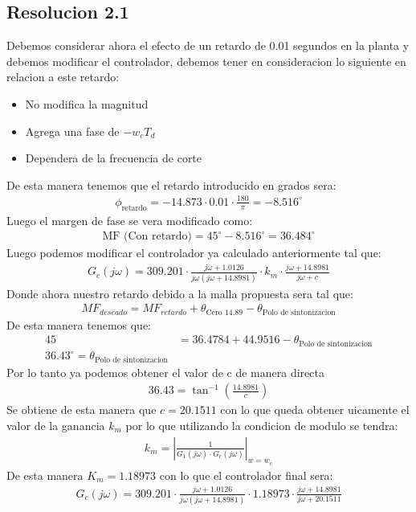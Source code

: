 \documentclass[
  11pt,
  letterpaper,
   addpoints,
   answers
  ]{exam}
\begin{document}
\begin{questions}
\begin{solution}
\subsection*{Resolucion 2.1}
Debemos considerar ahora el efecto de un retardo de 0.01 segundos en la planta y debemos modificar el controlador, debemos tener en consideracion lo siguiente en relacion a este retardo:
\begin{itemize}
    \item No modifica la magnitud
    \item Agrega una fase de $-w_{c}T_{d}$
    \item Dependera de la frecuencia de corte
\end{itemize}
De esta manera tenemos que el retardo introducido en grados sera:
\begin{align}
    \phi_{\text{retardo}} = -14.873 \cdot 0.01 \cdot \frac{180}{\pi} = -8.516^{\circ}
\end{align}
Luego el margen de fase se vera modificado como:
\begin{align}
    \text{MF (Con retardo)} = 45^{\circ} - 8.516^{\circ} = 36.484^{\circ}
\end{align}
Luego podemos modificar el controlador ya calculado anteriormente tal que:
\begin{align}
    G_{c}(j\omega) = 309.201 \cdot \frac{j\omega + 1.0126}{j\omega (j\omega + 14.8981)} \cdot k_{m} \cdot \frac{j\omega + 14.8981}{j\omega +c}
\end{align}
Donde ahora nuestro retardo debido a la malla propuesta sera tal que:
\begin{align}
    MF_{deseado} = MF_{retardo} + \theta_{\text{Cero 14.89}} - \theta_{\text{Polo de sintonizacion}}
\end{align}
De esta manera tenemos que:
\begin{align}
    45 &= 36.4784 + 44.9516 - \theta_{\text{Polo de sintonizacion}}\\
    36.43^{\circ} = \theta_{\text{Polo de sintonizacion}}
\end{align}
Por lo tanto ya podemos obtener el valor de c de manera directa
\begin{align}
    36.43 = \tan^{-1}\left(\frac{14.8981}{c}\right)
\end{align}
Se obtiene de esta manera que $c= 20.1511$ con lo que queda obtener uicamente el valor de la ganancia $k_{m}$ por lo que utilizando la condicion de modulo se tendra:
\begin{align}
    k_{m} = \left| \frac{1}{G_{1}(j\omega) \cdot G_{c}(j\omega)}\right|_{w=w_{c}}
\end{align}
De esta manera $K_{m} =1.18973$ con lo que el controlador final sera:
\begin{align}
    G_{c}(j\omega) = 309.201 \cdot \frac{j\omega + 1.0126}{j\omega (j\omega + 14.8981)} \cdot 1.18973 \cdot \frac{j\omega + 14.8981}{j\omega + 20.1511}
\end{align} 

\end{solution}
\end{questions}
\end{document}
